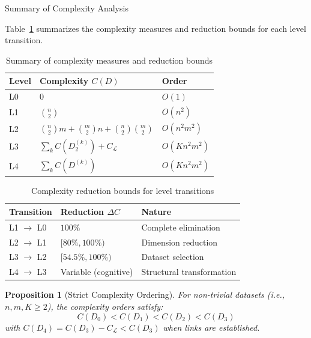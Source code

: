 \documentclass[]{hdsr}
\makeatletter
\def\subsection{\@startsection{subsection}{2}%
  \z@{.5\linespacing\@plus.7\linespacing}{.5\linespacing}%
  {\normalfont\bfseries}}
\theoremstyle{plain}      %
\newtheorem{proposition}[theorem]{Proposition}
\theoremstyle{definition} %
\theoremstyle{remark}     %
\makeatother
\begin{document}
\subsection{Summary of Complexity Analysis}

Table~\ref{tab:complexity_summary} summarizes the complexity measures and reduction bounds for each level transition.

\begin{table}[h!]
\centering
\caption{Summary of complexity measures and reduction bounds}
\label{tab:complexity_summary}
\begin{tabular}{lll}
\toprule
\textbf{Level} & \textbf{Complexity $C(D)$} & \textbf{Order} \\
\midrule
L0 & $0$ & $O(1)$ \\
L1 & $\displaystyle\binom{n}{2}$ & $O(n^2)$ \\
L2 & $\displaystyle\binom{n}{2}m + \binom{m}{2}n + \binom{n}{2}\binom{m}{2}$ & $O(n^2m^2)$ \\
L3 & $\displaystyle\sum_{k} C(D_2^{(k)}) + C_{\mathcal{L}}$ & $O(Kn^2m^2)$ \\
L4 & $\displaystyle\sum_{k} C(D^{(k)})$ & $O(Kn^2m^2)$ \\
\bottomrule
\end{tabular}
\end{table}

\begin{table}[h!]
\centering
\caption{Complexity reduction bounds for level transitions}
\label{tab:reduction_summary}
\begin{tabular}{lll}
\toprule
\textbf{Transition} & \textbf{Reduction $\Delta C$} & \textbf{Nature} \\
\midrule
L1 $\to$ L0 & $100\%$ & Complete elimination \\
L2 $\to$ L1 & $[80\%, 100\%)$ & Dimension reduction \\
L3 $\to$ L2 & $[54.5\%, 100\%)$ & Dataset selection \\
L4 $\to$ L3 & Variable (cognitive) & Structural transformation \\
\bottomrule
\end{tabular}
\end{table}

\begin{proposition}[Strict Complexity Ordering]
\label{prop:ordering}
For non-trivial datasets (i.e., $n, m, K \geq 2$), the complexity orders satisfy:
\[
C(D_0) < C(D_1) < C(D_2) < C(D_3)
\]
with $C(D_4) = C(D_3) - C_{\mathcal{L}} < C(D_3)$ when links are established.
\end{proposition}
\end{document}

